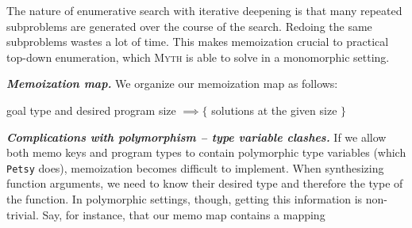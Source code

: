\documentclass[acmsmall,nonacm]{acmart}
\begin{document}
The nature of enumerative search with iterative deepening is that many
repeated subproblems are generated over the course of the search.
Redoing the same subproblems wastes a lot of time.
This makes memoization crucial to practical 
top-down enumeration, which \textsc{Myth} \cite{myth} is able to solve in a 
monomorphic setting.

\vspace{2mm}
\noindent \textbf{\textit{Memoization map.}}
We organize our memoization map as follows:

\begin{center}
  goal type and desired program size $\implies \big\{$ solutions at the given size $\big\}$
\end{center}


\vspace{1mm}
\noindent \textbf{\textit{Complications with polymorphism -- type variable clashes.}}
If we allow both memo keys and program types
to contain polymorphic type variables (which \texttt{Petsy} does), memoization becomes 
difficult to implement.
When synthesizing function arguments, we need to know their desired type 
and therefore the type of the function.
In polymorphic settings, though, getting this information is non-trivial. 
Say, for instance, that our memo map contains a mapping
\end{document}
